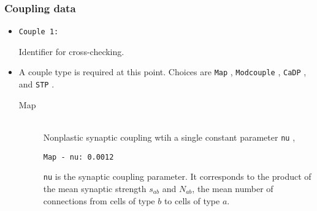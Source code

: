 \documentclass[12pt,a4paper]{article}
\newcommand{\type}[1]{ {\small\small\tt #1} }
\begin{document}
\subsubsection{Coupling data}
\label{sec:couple}

\begin{itemize}

	\item
	\begin{lstlisting}
Couple 1:
	\end{lstlisting}
	Identifier for cross-checking.
\item A couple type is required at this point. Choices are \type{Map}, \type{Modcouple}, \type{CaDP}, and \type{STP}.

\begin{description}

	\item[Map]\ \\
	Nonplastic synaptic coupling wtih a single constant parameter \type{nu},
	\begin{lstlisting}
Map - nu: 0.0012
	\end{lstlisting}
	\type{nu} is the synaptic coupling parameter. It corresponds to the product of the mean synaptic strength $s_{ab}$ and $N_{ab}$, the mean number of connections from cells of type $b$ to cells of type $a$.





\end{description}
\end{itemize}
\end{document}
